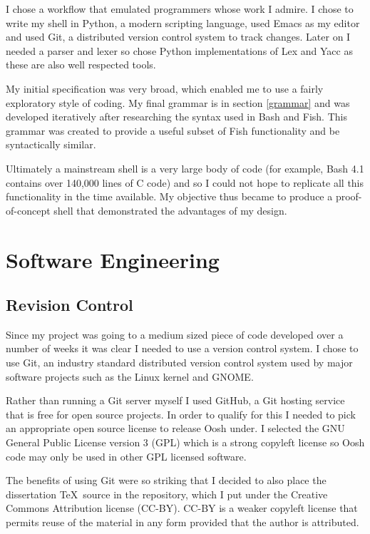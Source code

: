 \documentclass[12pt,twoside,notitlepage]{report}
\begin{document}
I chose a workflow that emulated programmers whose work I admire. I
chose to write my shell in Python, a modern scripting language, used
Emacs as my editor and used Git, a distributed version control system
to track changes. Later on I needed a parser and lexer so chose Python
implementations of Lex and Yacc as these are also well respected
tools.

My initial specification was very broad, which enabled me to use a
fairly exploratory style of coding. My final grammar is in section
\ref{grammar} and was developed iteratively after researching the
syntax used in Bash and Fish. This grammar was created to provide a
useful subset of Fish functionality and be syntactically similar.

Ultimately a mainstream shell is a very large body of code (for
example, Bash 4.1 contains over 140,000 lines of C
code\footnotemark[1]) and so I could not hope to replicate all this
functionality in the time available. My objective thus became to
produce a proof-of-concept shell that demonstrated the advantages of
my design.


\section{Software Engineering}

\subsection{Revision Control}

Since my project was going to a medium sized piece of code developed
over a number of weeks it was clear I needed to use a version control
system. I chose to use Git, an industry standard distributed version
control system used by major software projects such as the Linux
kernel and GNOME.

Rather than running a Git server myself I used GitHub, a Git hosting
service that is free for open source projects. In order to qualify for
this I needed to pick an appropriate open source license to release
Oosh under. I selected the GNU General Public License version 3
\cite{gpl} (GPL) which is a strong copyleft license so Oosh code may
only be used in other GPL licensed software.

The benefits of using Git were so striking that I decided to also
place the dissertation \TeX \ source in the repository, which I put
under the Creative Commons Attribution license \cite{cc-by}
(CC-BY). CC-BY is a weaker copyleft license that permits reuse of the
material in any form provided that the author is attributed.
\end{document}
